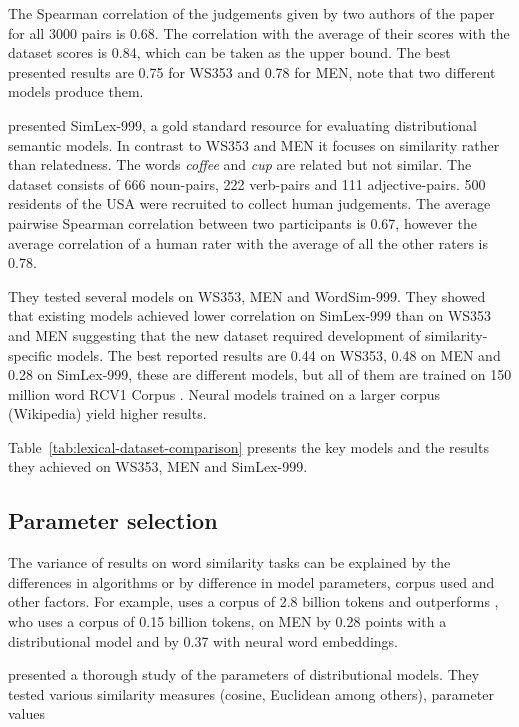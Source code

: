 The Spearman correlation of the judgements given by two authors of the paper for all 3000 pairs is 0.68. The correlation with the average of their scores with the dataset scores is 0.84, which can be taken as the upper bound. The best presented results are 0.75 for WS353 and 0.78 for MEN, note that two different models produce them.

 presented SimLex-999, a gold standard resource for evaluating distributional semantic models. In contrast to WS353 and MEN it focuses on similarity rather than relatedness. The words \textit{coffee} and \textit{cup} are related but not similar. The dataset consists of 666 noun-pairs, 222 verb-pairs and 111 adjective-pairs. 500 residents of the USA were recruited to collect human judgements. The average pairwise Spearman correlation between two participants is 0.67, however the average correlation of a human rater with the average of all the other raters is 0.78.

They tested several models on WS353, MEN and WordSim-999. They showed that existing models achieved lower correlation on SimLex-999 than on WS353 and MEN suggesting that the new dataset required development of similarity-specific models. The best reported results are 0.44 on WS353, 0.48 on MEN and 0.28 on SimLex-999, these are different models, but all of them are trained on 150 million word RCV1 Corpus \cite{lewis2004rcv1}. Neural models trained on a larger corpus (Wikipedia) yield higher results.

Table~\ref{tab:lexical-dataset-comparison} presents the key models and the results they achieved on WS353, MEN and SimLex-999.

\subsection{Parameter selection}
\label{sec:parameter-selection-intro}

The variance of results on word similarity tasks can be explained by the differences in algorithms or by difference in model parameters, corpus used and other factors. For example,  uses a corpus of 2.8 billion tokens and outperforms , who uses a corpus of 0.15 billion tokens, on MEN by 0.28 points with a distributional model and by 0.37 with neural word embeddings.

\cite{Bullinaria2007} presented a thorough study of the parameters of distributional models. They tested various similarity measures (cosine, Euclidean among others), parameter values

